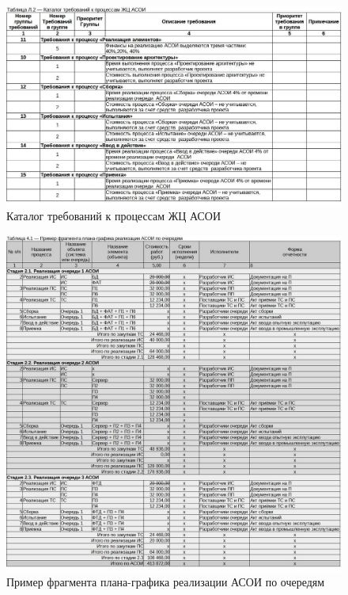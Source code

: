 \documentclass[12pt, a4paper, simple]{eskdtext}
\begin{document}
    \begin{figure}[p!]
        \centering
        \includegraphics[width=16cm]
            {_docs/ТаблицаЛ2КаталогТребованийКПроцессамЖЦАСОИ.jpg}
        \caption{Каталог требований к процессам ЖЦ АСОИ}
    \end{figure}

    \newpage


    \begin{figure}[h!]
        \centering
        \includegraphics[width=16cm]
            {_docs/Таблица4-1ПримерФрагментаПлана-графикаРеализацииАСОИПоОчередям.jpg}
        \caption{Пример фрагмента плана-графика реализации АСОИ по очередям}
    \end{figure}
\end{document}
